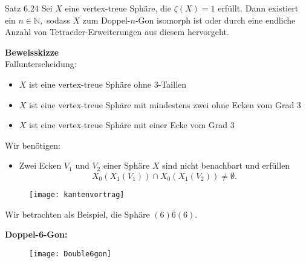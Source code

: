 \documentclass{beamer}
\begin{document}
\begin{frame}
\begin{block}{Satz 6.24}
Sei $X$ eine vertex-treue Sphäre, die $\zeta(X)=1$ erfüllt. Dann existiert ein $n\in \mathbb{N}, $ sodass $X$ zum Doppel-$n$-Gon isomorph ist oder durch eine endliche Anzahl von Tetraeder-Erweiterungen aus diesem hervorgeht.

\end{block}
\end{frame}
\begin{frame}
\textbf{Beweisskizze}\\
Fallunterscheidung:
\begin{itemize}
\item $X$ ist eine vertex-treue Sphäre ohne 3-Taillen\pause
\item $X$ ist eine vertex-treue Sphäre mit mindestens zwei  ohne Ecken vom Grad 3\pause 
\item $X$ ist eine vertex-treue Sphäre mit einer Ecke vom Grad 3
\end{itemize}
\end{frame}
\begin{frame}
\begin{center}
\begin{huge}
\end{huge}
\end{center}
\end{frame}
\begin{frame}
Wir benötigen:
\begin{itemize}
\item Zwei Ecken $V_1$ und $V_2$ einer Sphäre $X$ sind nicht benachbart und erfüllen
\[
X_0(X_1(V_1))\cap X_0(X_1(V_2))\neq \emptyset.
\] 
\end{itemize}
  \begin{figure}[H]
\begin{center}
\texttt{[image: kantenvortrag]}
\end{center}
\end{figure}
\pause
Wir betrachten als Beispiel, die Sphäre $(6)\overline{6}(6).$
\end{frame}
\begin{frame}
\textbf{Doppel-6-Gon:}
\begin{figure}[H]
\begin{center}
\texttt{[image: Double6gon]}
\end{center}
\end{figure}
\end{frame}
\end{document}
